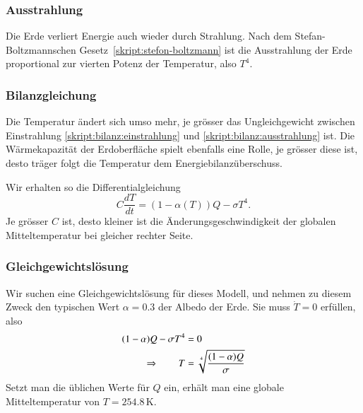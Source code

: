 \subsubsection{Ausstrahlung}
Die Erde verliert Energie auch wieder durch Strahlung.
Nach dem Stefan-Boltzmannschen Gesetz~\eqref{skript:stefon-boltzmann}
ist die Ausstrahlung der Erde proportional zur vierten Potenz der
Temperatur, also $T^4$.

\subsubsection{Bilanzgleichung}
Die Temperatur ändert sich umso mehr, je grösser das Ungleichgewicht
zwischen Einstrahlung \eqref{skript:bilanz:einstrahlung} und
\eqref{skript:bilanz:ausstrahlung} ist.
Die Wärmekapazität der Erdoberfläche spielt ebenfalls
eine Rolle, je grösser diese ist, desto träger folgt die Temperatur dem
Energiebilanzüberschuss.

Wir erhalten so die Differentialgleichung
\begin{equation}
C\frac{dT}{dt}
=
(1-\alpha(T)) Q - \sigma T^4.
\label{skript:bilanz:basic}
\end{equation}
Je grösser $C$ ist, desto kleiner ist die Änderungsgeschwindigkeit der
globalen Mitteltemperatur bei gleicher rechter Seite.

\subsubsection{Gleichgewichtslösung}
Wir suchen eine Gleichgewichtslösung für dieses Modell, und nehmen zu diesem
Zweck den typischen Wert $\alpha=0.3$ der Albedo der Erde.
Sie muss $\dot T=0$ erfüllen, also
\begin{align*}
(1-\alpha) Q -\sigma T^4 &=0
\\
\Rightarrow
\qquad
T&=\root 4\of{\frac{(1-\alpha)Q}{\sigma}}
\end{align*}
Setzt man die üblichen Werte für $Q$ ein, erhält man eine globale
Mitteltemperatur von $T=254.8\,\text{K}$.

